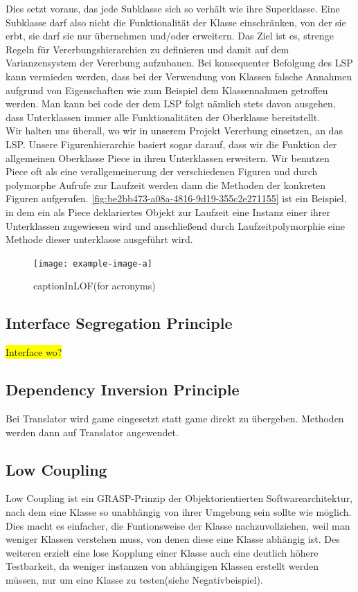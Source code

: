 \documentclass[
10pt, %
a4paper, %
oneside, %
headinclude,footinclude, %
BCOR5mm, %
]{scrartcl}
\begin{document}
\begin{onehalfspace}
Dies setzt voraus, das jede Subklasse sich so verhält wie ihre Superklasse. Eine Subklasse darf also nicht die Funktionalität der Klasse einschränken, von der sie erbt, sie darf sie nur übernehmen und/oder erweitern. Das Ziel ist es, strenge Regeln für Vererbungshierarchien zu definieren und damit auf dem Varianzensystem der Vererbung aufzubauen. Bei konsequenter Befolgung des LSP kann vermieden werden, dass bei der Verwendung von Klassen falsche Annahmen aufgrund von Eigenschaften wie zum Beispiel dem Klassennahmen getroffen werden. Man kann bei code der dem LSP folgt nämlich stets davon ausgehen, dass Unterklassen immer alle Funktionalitäten der Oberklasse bereitstellt.
\\
Wir halten uns überall, wo wir in unserem Projekt Vererbung einsetzen, an das LSP. Unsere Figurenhierarchie basiert sogar darauf, dass wir die Funktion der allgemeinen Oberklasse Piece in ihren Unterklassen erweitern. Wir benutzen Piece oft als eine verallgemeinerung der verschiedenen Figuren und durch polymorphe Aufrufe zur Laufzeit werden dann die Methoden der konkreten Figuren aufgerufen. \autoref{fig:be2bb473-a08a-4816-9d19-355c2e271155} ist ein Beispiel, in dem ein als Piece deklariertes Objekt zur Laufzeit eine Instanz einer ihrer Unterklassen zugewiesen wird und anschließend durch Laufzeitpolymorphie eine Methode dieser unterklasse ausgeführt wird.

\begin{figure}[ht]
	\texttt{[image: example-image-a]}
	\caption[captionInLOF(for acronyms)]{captionInLOF(for acronyms)}
	\label{fig:be2bb473-a08a-4816-9d19-355c2e271155}
\end{figure}
\subsection{Interface Segregation Principle}
\colorbox{yellow}{Interface wo?}
\subsection{Dependency Inversion Principle}
Bei Translator wird game eingesetzt statt game direkt zu übergeben. Methoden werden dann auf Translator angewendet.
\subsection{Low Coupling}
Low Coupling ist ein GRASP-Prinzip der Objektorientierten Softwarearchitektur, nach dem eine Klasse so unabhängig von ihrer Umgebung sein sollte wie möglich. Dies macht es einfacher, die Funtionsweise der Klasse nachzuvollziehen, weil man weniger Klassen verstehen muss, von denen diese eine Klasse abhängig ist. Des weiteren erzielt eine lose Kopplung einer Klasse auch eine deutlich höhere Testbarkeit, da weniger instanzen von abhängigen Klassen erstellt werden müssen, nur um eine Klasse zu testen(siehe Negativbeispiel).


\end{onehalfspace}
\end{document}
